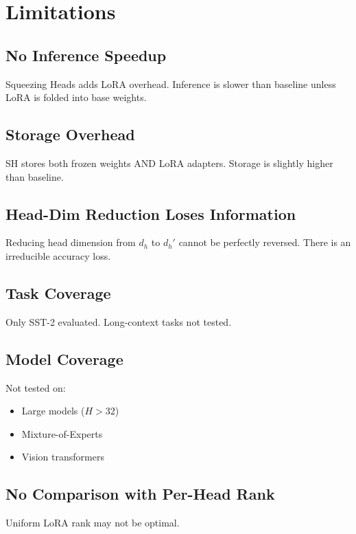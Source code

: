 
\section{Limitations}

\subsection{No Inference Speedup}

Squeezing Heads adds LoRA overhead. Inference is slower than baseline 
unless LoRA is folded into base weights.

\subsection{Storage Overhead}

SH stores both frozen weights AND LoRA adapters. Storage is slightly 
higher than baseline.

\subsection{Head-Dim Reduction Loses Information}

Reducing head dimension from $d_h$ to $d_h'$ cannot be perfectly reversed. 
There is an irreducible accuracy loss.

\subsection{Task Coverage}

Only SST-2 evaluated. Long-context tasks not tested.

\subsection{Model Coverage}

Not tested on:
\begin{itemize}
\item Large models ($H > 32$)
\item Mixture-of-Experts
\item Vision transformers

\end{itemize}
\subsection{No Comparison with Per-Head Rank}

Uniform LoRA rank may not be optimal.

